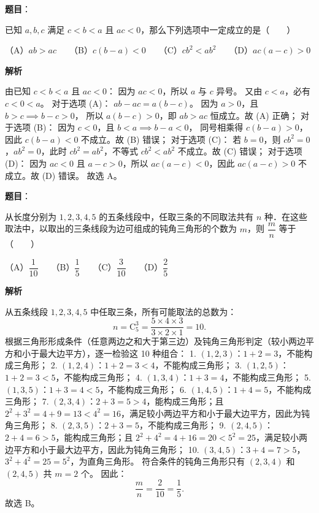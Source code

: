 \begin{answer}

\textbf{题目}：

已知 $a, b, c$ 满足 $c<b<a$ 且 $ac<0$，那么下列选项中一定成立的是\mbox{（　　）}

（A）$ab>ac$　　（B）$c(b-a)<0$　　（C）$cb^2<ab^2$　　（D）$ac(a-c)>0$

\textbf{解析}

由已知 $c<b<a$ 且 $ac<0$：
因为 $ac<0$，所以 $a$ 与 $c$ 异号。
又由 $c<a$，必有 $c<0<a$。
对于选项 (A)：
$ab-ac=a(b-c)$。
因为 $a>0$，且 $b>c\implies b-c>0$，
所以 $a(b-c)>0$，即 $ab>ac$ 恒成立。故 (A) 正确；
对于选项 (B)：
因为 $c<0$，且 $b<a\implies b-a<0$，
同号相乘得 $c(b-a)>0$，因此 $c(b-a)<0$ 不成立。故 (B) 错误；
对于选项 (C)：
若 $b=0$，则 $cb^2=0$，$ab^2=0$，此时 $cb^2=ab^2$，不等式 $cb^2<ab^2$ 不成立。故 (C) 错误；
对于选项 (D)：
因为 $ac<0$ 且 $a-c>0$，所以 $ac(a-c)<0$，因此 $ac(a-c)>0$ 不成立。故 (D) 错误。
故选 A。


\end{answer}
\begin{answer}

\textbf{题目}：

从长度分别为 $1, 2, 3, 4, 5$ 的五条线段中，任取三条的不同取法共有 $n$ 种．在这些取法中，以取出的三条线段为边可组成的钝角三角形的个数为 $m$，则 $\dfrac{m}{n}$ 等于\mbox{（　　）}

（A）$\dfrac{1}{10}$　　（B）$\dfrac{1}{5}$　　（C）$\dfrac{3}{10}$　　（D）$\dfrac{2}{5}$

\textbf{解析}

从五条线段 $1, 2, 3, 4, 5$ 中任取三条，所有可能取法的总数为：
\nopagebreak[4]
\[
n=\mathrm{C}_5^3=\frac{5\times 4\times 3}{3\times 2\times 1}=10.
\]
根据三角形形成条件（任意两边之和大于第三边）及钝角三角形判定（较小两边平方和小于最大边平方），逐一检验这 10 种组合：
1. $(1,2,3)$：$1+2=3$，不能构成三角形；
2. $(1,2,4)$：$1+2=3<4$，不能构成三角形；
3. $(1,2,5)$：$1+2=3<5$，不能构成三角形；
4. $(1,3,4)$：$1+3=4$，不能构成三角形；
5. $(1,3,5)$：$1+3=4<5$，不能构成三角形；
6. $(1,4,5)$：$1+4=5$，不能构成三角形；
7. $(2,3,4)$：$2+3=5>4$，能构成三角形；且 $2^2+3^2=4+9=13<4^2=16$，满足较小两边平方和小于最大边平方，因此为钝角三角形；
8. $(2,3,5)$：$2+3=5$，不能构成三角形；
9. $(2,4,5)$：$2+4=6>5$，能构成三角形；且 $2^2+4^2=4+16=20<5^2=25$，满足较小两边平方和小于最大边平方，因此为钝角三角形；
10. $(3,4,5)$：$3+4=7>5$，$3^2+4^2=25=5^2$，为直角三角形。
符合条件的钝角三角形只有 $(2,3,4)$ 和 $(2,4,5)$ 共 $m=2$ 个。
因此：
\nopagebreak[4]
\[
\frac{m}{n}=\frac{2}{10}=\frac{1}{5}.
\]
故选 B。


\end{answer}
